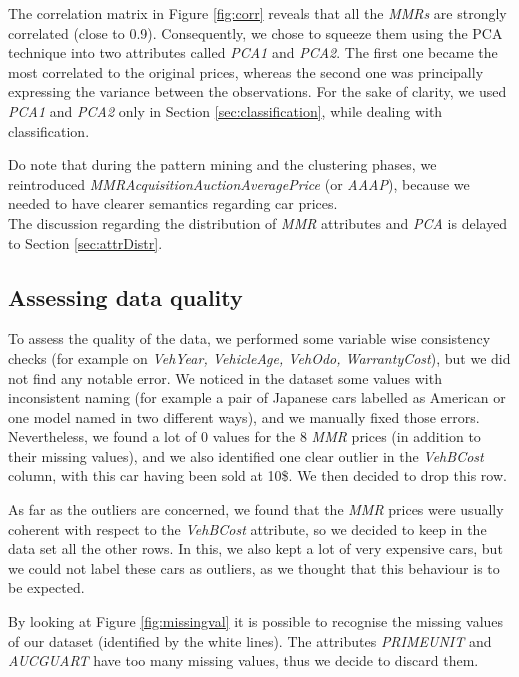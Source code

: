\documentclass{article}
\begin{document}
	The correlation matrix in Figure \ref{fig:corr} reveals that all the \emph{MMRs} are strongly correlated (close to 0.9). Consequently, we chose to squeeze them using the PCA technique into two attributes called \emph{PCA1} and \emph{PCA2}. The first one became the most correlated to the original prices, whereas the second one was principally expressing the variance between the observations. For the sake of clarity, we used \emph{PCA1} and \emph{PCA2} only in Section \ref{sec:classification}, while dealing with classification.
	
	Do note that during the pattern mining and the clustering phases, we reintroduced \emph{MMRAcquisitionAuctionAveragePrice} (or \emph{AAAP}), because we needed to have clearer semantics regarding car prices. \\
	The discussion regarding the distribution of \emph{MMR} attributes and \emph{PCA} is delayed to Section \ref{sec:attrDistr}.
	
	\subsection{Assessing data quality}
	
	To assess the quality of the data, we performed some variable wise consistency checks (for example on \emph{VehYear, VehicleAge, VehOdo, WarrantyCost}), but we did not find any notable error.
	We noticed in the dataset some values with inconsistent naming (for example a pair of Japanese cars labelled as American or one model named in two different ways), and we manually fixed those errors.
	Nevertheless, we found a lot of 0 values for the 8 \emph{MMR} prices (in addition to their missing values), and we also identified one clear outlier in the \emph{VehBCost} column, with this car having been sold at 10\$. We then decided to drop this row.
	
	As far as the outliers are concerned, we found that the \emph{MMR} prices were usually coherent with respect to the \emph{VehBCost} attribute, so we decided to keep in the data set all the other rows. In this, we also kept a lot of very expensive cars, but we could not label these cars as outliers, as we thought that this behaviour is to be expected.
	
	By looking at Figure \ref{fig:missingval} it is possible to recognise the missing values of our dataset (identified by the white lines). The attributes \emph{PRIMEUNIT} and \emph{AUCGUART} have too many missing values, thus we decide to discard them.\\
	
\end{document}
